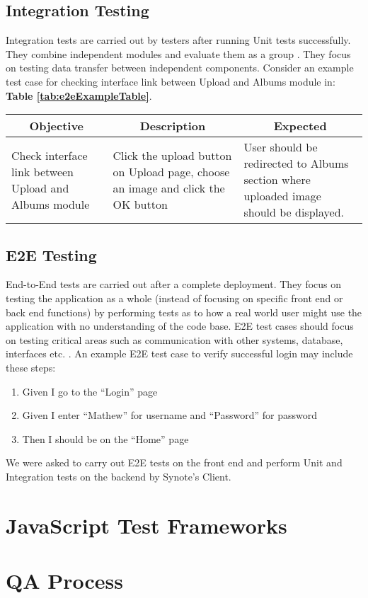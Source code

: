 \subsection{Integration Testing}
\label{subsec:unit-testing}

Integration tests are carried out by testers after running Unit tests successfully. They combine independent modules and evaluate them as a group \cite{search-software-quality}. They focus on testing data transfer between independent components. Consider an example test case for checking interface link between Upload and Albums module in:  \textbf{Table \ref{tab:e2eExampleTable}}.

\begin{center}
\begin{tabular}{ |p{4cm}|p{4cm}|p{4cm}|  }

 \hline
 	\multicolumn{1}{|c|}{Objective} &
 	\multicolumn{1}{|c|}{Description} &
 	\multicolumn{1}{|c|}{Expected}  \\
 \hline
 	Check interface link between Upload and Albums module & Click the upload button on Upload page, choose an image and click the OK button & User should be redirected to Albums section where uploaded image should be displayed. \\
 \hline

\end{tabular}
\label{tab:e2eExampleTable}
\end{center}

\subsection{E2E Testing}
\label{subsec:e2e-testing}

End-to-End tests are carried out after a complete deployment. They focus on testing the application as a whole (instead of focusing on specific front end or back end functions) by performing tests as to how a real world user might use the application with no understanding of the code base. E2E test cases should focus on testing critical areas such as communication with other systems, database, interfaces etc. \cite{tutorialspoint}. An example E2E test case to verify successful login may include these steps:

\begin{enumerate}
	\item Given I go to the “Login” page
    \item Given I enter “Mathew” for username and “Password” for password
    \item Then I should be on the “Home” page
\end{enumerate}

We were asked to carry out E2E tests on the front end and perform Unit and Integration tests on the backend by Synote’s Client.

\section{JavaScript Test Frameworks}
\label{sec:frameworks}

\section{QA Process}
\label{sec:qa-process}
